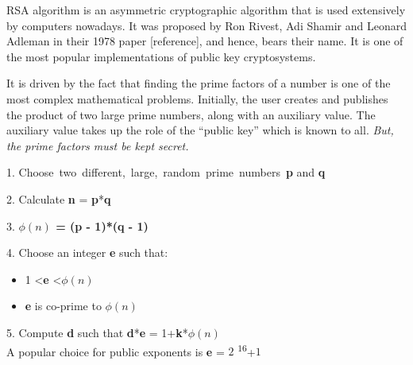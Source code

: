 \documentclass[12 pt]{article}
\begin{document}
\noindent RSA algorithm is an asymmetric cryptographic algorithm that is used extensively by computers nowadays. It was proposed by Ron Rivest, Adi Shamir and Leonard Adleman in their 1978 paper [reference], and hence, bears their name. It is one of the most popular implementations of public key cryptosystems.\bigskip

\noindent It is driven by the fact that finding the prime factors of a number is one of the most complex mathematical problems. Initially, the user creates and publishes the product of two large prime numbers, along with an auxiliary value. The auxiliary value takes up the role of the ``public key'' which is known to all. \emph{But, the prime factors must be kept secret.}\bigskip

1. Choose\ two\ different,\ large,\ random\  prime\  numbers\ \textbf{p} and \textbf{q}

2. Calculate \textbf{n} = \textbf{p}*\textbf{q}

3. \textbf{\boldmath $\phi(n)$ = (p - 1)*(q - 1)}

4. Choose an integer \textbf{e} such that:

\begin{itemize} \setlength\itemsep{1 em}
 \item  1 \textless \textbf{e} \textless \boldmath$\phi(n)$
 \item \textbf{e} is co-prime to \boldmath$\phi(n)$
\end{itemize}

5. Compute \textbf{d} such that \boldmath \textbf{d}*\textbf{e} = 1+\textbf{k}*\boldmath $\phi(n)$
\bigskip
\\
A popular choice for public exponents is \textbf{e} = $2$ \textsuperscript{$16$}+$1$
\end{document}
